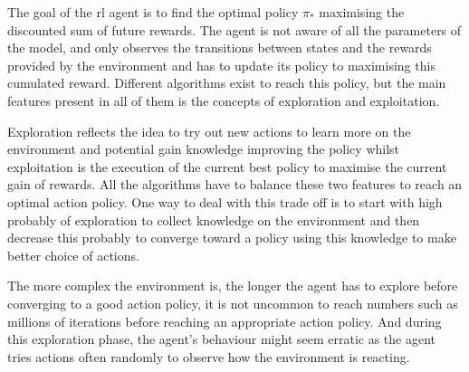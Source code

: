 	The goal of the \gls{rl} agent is to find the optimal policy $\pi_*$ maximising the discounted sum of future rewards. The agent is not aware of all the parameters of the model, and only observes the transitions between states and the rewards provided by the environment and has to update its policy to maximising this cumulated reward. Different algorithms exist to reach this policy, but the main features present in all of them is the concepts of exploration and exploitation.
	
	Exploration reflects the idea to try out new actions to learn more on the environment and potential gain knowledge improving the policy whilst exploitation is the execution of the current best policy to maximise the current gain of rewards. All the algorithms have to balance these two features to reach an optimal action policy. One way to deal with this trade off is to start with high probably of exploration to collect knowledge on the environment and then decrease this probably to converge toward a policy using this knowledge to make better choice of actions.
	
	The more complex the environment is, the longer the agent has to explore before converging to a good action policy, it is not uncommon to reach numbers such as millions of iterations before reaching an appropriate action policy. And during this exploration phase, the agent's behaviour might seem erratic as the agent tries actions often randomly to observe how the environment is reacting.
	
	
